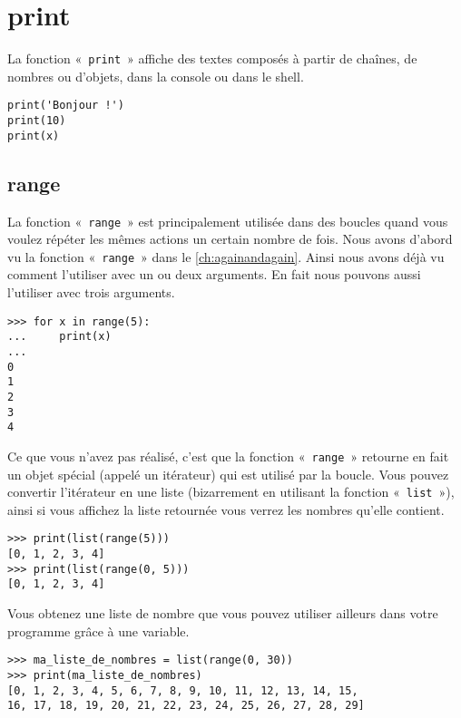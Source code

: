 \section*{print}
La fonction «~\texttt{print}~» affiche des textes composés à partir de chaînes, de nombres ou d'objets, dans la console ou dans le shell. 
\begin{Verbatim}[frame=single,rulecolor=\color{gray}]
print('Bonjour !')
print(10)
print(x)
\end{Verbatim}

\subsection*{range}

La fonction «~\texttt{range}~» est principalement utilisée dans des boucles quand vous voulez répéter les mêmes actions un certain nombre de fois.  Nous avons d'abord vu la fonction «~\texttt{range}~» dans le \autoref{ch:againandagain}. Ainsi nous avons déjà vu comment l'utiliser avec un ou deux arguments. En fait nous pouvons aussi l'utiliser avec trois arguments.

\begin{Verbatim}[frame=single,rulecolor=\color{gray}]
>>> for x in range(5):
...     print(x)
... 
0
1
2
3
4
\end{Verbatim}

Ce que vous n'avez pas réalisé, c'est que la fonction «~\texttt{range}~» retourne en fait un objet spécial (appelé un itérateur) qui est utilisé par la boucle. Vous pouvez convertir l'itérateur en une liste (bizarrement en utilisant la fonction «~\texttt{list}~»), ainsi si vous affichez la liste retournée vous verrez les nombres qu'elle contient.  

\begin{Verbatim}[frame=single,rulecolor=\color{gray}]
>>> print(list(range(5)))
[0, 1, 2, 3, 4]
>>> print(list(range(0, 5)))
[0, 1, 2, 3, 4]
\end{Verbatim}

Vous obtenez une liste de nombre que vous pouvez utiliser ailleurs dans votre programme grâce à une variable.

\begin{Verbatim}[frame=single,rulecolor=\color{gray}]
>>> ma_liste_de_nombres = list(range(0, 30))
>>> print(ma_liste_de_nombres)
[0, 1, 2, 3, 4, 5, 6, 7, 8, 9, 10, 11, 12, 13, 14, 15, 
16, 17, 18, 19, 20, 21, 22, 23, 24, 25, 26, 27, 28, 29]
\end{Verbatim}

